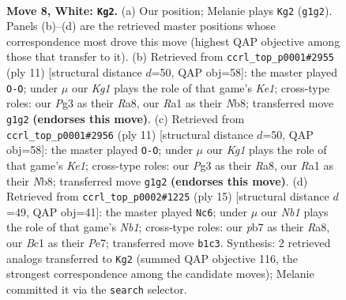 \documentclass[11pt]{article}
\begin{document}
\begin{figure}[p]\centering
\begin{subfigure}{0.46\textwidth}\centering
\resizebox{\linewidth}{!}{%
\newchessgame
\chessboard[
  setfen={rnbqr1k1/pp2bppp/4pn2/2pp4/2P5/1P3NPB/P2PPP1P/RNBQ1RK1 w - - 2 8},
  showmover=false,
  pgfstyle=straightmove, color=movearrow, markmove={g1-g2}
]}
\caption{}
\end{subfigure}\hfill
\begin{subfigure}{0.46\textwidth}\centering
\resizebox{\linewidth}{!}{%
\newchessgame
\chessboard[
  setfen={rnbqk2r/ppp1npbp/4p1p1/3p4/2P2P2/5NP1/PP1PP1BP/RNBQ1RK1 b kq - 4 6},
  showmover=false,
  pgfstyle=straightmove, color=movearrow, markmove={e8-g8}
]}
\caption{}
\end{subfigure}
\\[4pt]
\begin{subfigure}{0.46\textwidth}\centering
\resizebox{\linewidth}{!}{%
\newchessgame
\chessboard[
  setfen={rnbqk2r/ppp1npbp/4p1p1/3p4/2P2P2/5NP1/PP1PP1BP/RNBQ1RK1 b kq - 4 6},
  showmover=false,
  pgfstyle=straightmove, color=movearrow, markmove={e8-g8}
]}
\caption{}
\end{subfigure}\hfill
\begin{subfigure}{0.46\textwidth}\centering
\resizebox{\linewidth}{!}{%
\newchessgame
\chessboard[
  setfen={rn1q1rk1/pb1pppbp/1p3np1/2p5/2P1P3/2NP1NP1/PP3PBP/R1BQ1RK1 b - - 0 8},
  showmover=false,
  pgfstyle=straightmove, color=movearrow, markmove={b8-c6}
]}
\caption{}
\end{subfigure}
\caption{\textbf{Move 8, White: \texttt{Kg2}.} (a) Our position; Melanie plays \texttt{Kg2} (\texttt{g1g2}). Panels (b)--(d) are the retrieved master positions whose correspondence most drove this move (highest QAP objective among those that transfer to it). (b) Retrieved from \texttt{ccrl\_top\_p0001\#2955} (ply 11) [structural distance $d$=50, QAP obj=58]: the master played \texttt{O-O}; under $\mu$ our \emph{Kg1} plays the role of that game's \emph{Ke1}; cross-type roles: our \emph{P}g3 as their \emph{R}a8, our \emph{R}a1 as their \emph{N}b8; transferred move \texttt{g1g2} \textbf{(endorses this move)}. (c) Retrieved from \texttt{ccrl\_top\_p0001\#2956} (ply 11) [structural distance $d$=50, QAP obj=58]: the master played \texttt{O-O}; under $\mu$ our \emph{Kg1} plays the role of that game's \emph{Ke1}; cross-type roles: our \emph{P}g3 as their \emph{R}a8, our \emph{R}a1 as their \emph{N}b8; transferred move \texttt{g1g2} \textbf{(endorses this move)}. (d) Retrieved from \texttt{ccrl\_top\_p0002\#1225} (ply 15) [structural distance $d$=49, QAP obj=41]: the master played \texttt{Nc6}; under $\mu$ our \emph{Nb1} plays the role of that game's \emph{Nb1}; cross-type roles: our \emph{p}b7 as their \emph{R}a8, our \emph{B}c1 as their \emph{P}e7; transferred move \texttt{b1c3}. Synthesis: 2 retrieved analogs transferred to \texttt{Kg2} (summed QAP objective 116, the strongest correspondence among the candidate moves); Melanie committed it via the \texttt{search} selector.}
\label{fig:thought-m14}
\end{figure}
\end{document}
